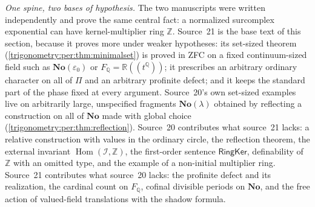 \documentclass[11pt,letterpaper]{article}
\numberwithin{equation}{section}
\theoremstyle{definition}
\theoremstyle{remark}
\newcommand{\No}{\mathbf{No}}
\newcommand{\R}{\mathbb R}
\newcommand{\Q}{\mathbb Q}
\newcommand{\Z}{\mathbb Z}
\newcommand{\eps}{\varepsilon}
\newcommand{\Hom}{\operatorname{Hom}}
\newcommand{\cI}{\mathcal I}
\begin{document}
\emph{One spine, two bases of hypothesis.} The two manuscripts were written independently and prove
the same central fact: a normalized surcomplex exponential can have kernel-multiplier ring $\Z$. Source~21
is the base text of this section, because it proves more under weaker hypotheses: its set-sized theorem
(\cref{trigonometry:per:thm:minimalset}) is proved in ZFC on a fixed continuum-sized field such as
$\No(\eps_0)$ or $F_{\Q}=\R((t^{\Q}))$; it prescribes an arbitrary ordinary character on all of
$\Pi$ and an arbitrary profinite defect; and it keeps the standard part of the phase fixed at every
argument. Source~20's own set-sized examples live on arbitrarily large, unspecified fragments
$\No(\lambda)$ obtained by reflecting a construction on all of $\No$ made with global choice
(\cref{trigonometry:per:thm:reflection}). Source~20 contributes what source~21 lacks: a relative
construction with values in the ordinary circle, the reflection theorem, the external invariant
$\Hom(\cI,\Z)$, the first-order sentence $\mathsf{RingKer}$, definability of $\Z$ with an omitted
type, and the example of a non-initial multiplier ring. Source~21 contributes what source~20 lacks:
the profinite defect and its realization, the cardinal count on $F_{\Q}$, cofinal divisible periods
on $\No$, and the free action of valued-field translations with the shadow formula.
\end{document}

